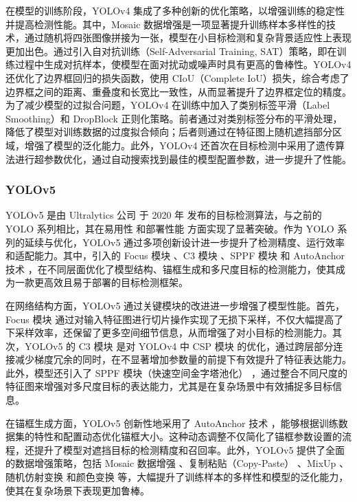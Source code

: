 \documentclass[11pt,twocolumn]{ctexart}
\begin{document}
在模型的训练阶段，YOLOv4 集成了多种创新的优化策略，以增强训练的稳定性并提高检测性能。其中，Mosaic 数据增强是一项显著提升训练样本多样性的技术，通过随机将四张图像拼接为一张，模型在小目标检测和复杂背景适应性上表现更加出色。通过引入自对抗训练（Self-Adversarial Training, SAT）策略，即在训练过程中生成对抗样本，使模型在面对扰动或噪声时具有更高的鲁棒性。YOLOv4 还优化了边界框回归的损失函数，使用 CIoU（Complete IoU）损失，综合考虑了边界框之间的距离、重叠度和长宽比一致性，从而显著提升了边界框定位的精度。为了减少模型的过拟合问题，YOLOv4 在训练中加入了类别标签平滑（Label Smoothing）和 DropBlock 正则化策略。前者通过对类别标签分布的平滑处理，降低了模型对训练数据的过度拟合倾向；后者则通过在特征图上随机遮挡部分区域，增强了模型的泛化能力。此外，YOLOv4 还首次在目标检测中采用了遗传算法进行超参数优化，通过自动搜索找到最佳的模型配置参数，进一步提升了性能。

\subsubsection{YOLOv5}
YOLOv5\cite{yolov5} 是由 Ultralytics 公司 于 2020 年 发布的目标检测算法，与之前的 YOLO 系列相比，其在易用性 和部署性能 方面实现了显著突破。作为 YOLO 系列的延续与优化，YOLOv5 通过多项创新设计进一步提升了检测精度、运行效率和适配能力。其中，引入的 Focus 模块 、C3 模块 、SPPF 模块 和 AutoAnchor 技术 ，在不同层面优化了模型结构、锚框生成和多尺度目标的检测能力，使其成为一款更高效且易于部署的目标检测框架。


在网络结构方面，YOLOv5 通过关键模块的改进进一步增强了模型性能。首先，Focus 模块 通过对输入特征图进行切片操作实现了无损下采样，不仅大幅提高了下采样效率，还保留了更多空间细节信息，从而增强了对小目标的检测能力。其次，YOLOv5 的 C3 模块 是对 YOLOv4 中 CSP 模块 的优化，通过跨层部分连接减少梯度冗余的同时，在不显著增加参数量的前提下有效提升了特征表达能力。此外，模型还引入了 SPPF 模块（快速空间金字塔池化） ，通过整合不同尺度的特征图来增强对多尺度目标的表达能力，尤其是在复杂场景中有效捕捉多目标信息。

在锚框生成方面，YOLOv5 创新性地采用了 AutoAnchor 技术 ，能够根据训练数据集的特性和配置动态优化锚框大小。这种动态调整不仅简化了锚框参数设置的流程，还提升了模型对遮挡目标的检测精度和召回率。此外，YOLOv5 提供了全面的数据增强策略，包括 Mosaic 数据增强 、复制粘贴（Copy-Paste） 、MixUp 、随机仿射变换 和颜色变换 等，大幅提升了训练样本的多样性和模型的泛化能力，使其在复杂场景下表现更加鲁棒。
\end{document}
